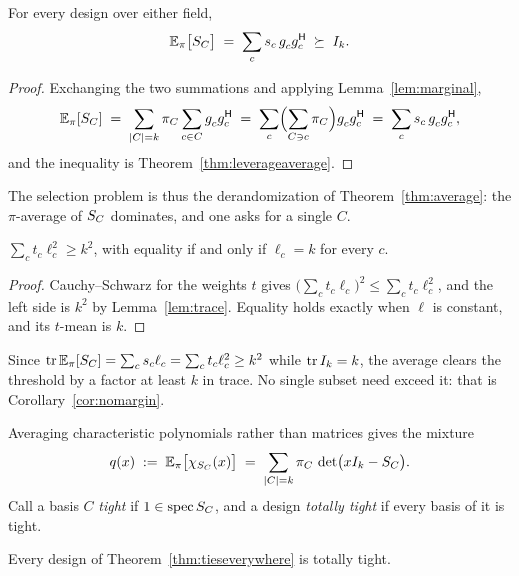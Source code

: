 \begin{theorem}\label{thm:average}
For every design over either field,
\[
  \E_{\pi}\bigl[\SC\bigr]
  \;=\;\sum_{c}s_c\,g_c^{\vphantom{\mathsf{H}}}g_c\adj
  \;\psd\;I_k .
\]
\end{theorem}

\begin{proof}
Exchanging the two summations and applying Lemma~\ref{lem:marginal},
\[
  \E_\pi[\SC]\;=\;\sum_{\lvert C\rvert=k}\pi_C\sum_{c\in C}
  g_c^{\vphantom{\mathsf{H}}}g_c\adj
  \;=\;\sum_{c}\Bigl(\sum_{C\ni c}\pi_C\Bigr)g_c^{\vphantom{\mathsf{H}}}g_c\adj
  \;=\;\sum_c s_c\,g_c^{\vphantom{\mathsf{H}}}g_c\adj ,
\]
and the inequality is Theorem~\ref{thm:leverageaverage}.
\end{proof}

The selection problem is thus the derandomization of
Theorem~\ref{thm:average}: the $\pi$-average of $S_{C}$ dominates, and one
asks for a single $C$.

\begin{proposition}[Lean]\label{prop:jensen}
$\sum_c t_c\ell_c^{2}\ge k^{2}$, with equality if and only if $\ell_c=k$
for every $c$.
\end{proposition}

\begin{proof}
Cauchy--Schwarz for the weights $t$ gives
$\bigl(\sum_ct_c\ell_c\bigr)^{2}\le\sum_ct_c\ell_c^{2}$, and the left side
is $k^{2}$ by Lemma~\ref{lem:trace}.  Equality holds exactly when $\ell$
is constant, and its $t$-mean is $k$.
\end{proof}

Since $\operatorname{tr}\mathbb{E}_\pi[S_{C}]=\sum_cs_c\ell_c=\sum_ct_c\ell_c^{2}\ge k^{2}$ while
$\operatorname{tr} I_k=k$, the average clears the threshold by a factor at least $k$ in
trace.  No single subset need exceed it: that is
Corollary~\ref{cor:nomargin}.

Averaging characteristic polynomials rather than matrices gives the
mixture
\begin{equation}\label{eq:mixture}
  q(x)\;:=\;\mathbb{E}_\pi\bigl[\chi_{S_{C}}(x)\bigr]
  \;=\;\sum_{\lvert C\rvert=k}\pi_C\,\det\bigl(xI_k-S_{C}\bigr).
\end{equation}
Call a basis $C$ \emph{tight} if $1\in\operatorname{spec}S_{C}$, and a
design \emph{totally tight} if every basis of it is tight.

\begin{proposition}\label{prop:totaltight}
Every design of Theorem~\ref{thm:tieseverywhere} is totally tight.
\end{proposition}

